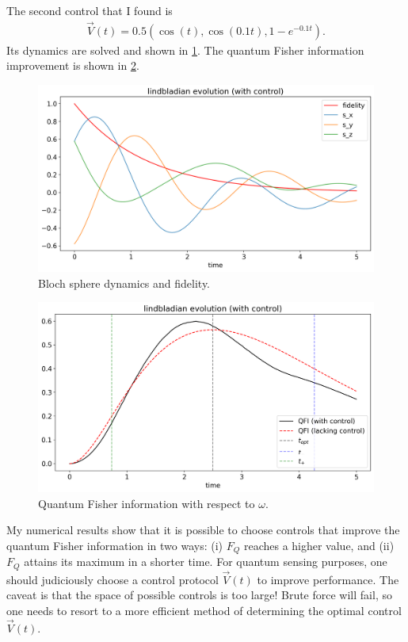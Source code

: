\documentclass[12pt]{article}
\begin{document}
The second control that I found is 
\begin{align}
    \vec{V}(t) = 0.5 (\cos(t), \cos(0.1 t), 1-e^{-0.1 t}).
\end{align}
Its dynamics are solved and shown in \ref{fig: bloch_yes_control2}. The quantum Fisher information improvement is shown in \ref{fig: info_yes_control2}.
\begin{figure}[ht]
    \centering
    \includegraphics[width=12cm]{bloch_yes_control2.png}
    \caption{Bloch sphere dynamics and fidelity.}
    \label{fig: bloch_yes_control2}
    \centering
\end{figure}
\begin{figure}[ht]
    \centering
    \includegraphics[width=12cm]{info_yes_control2.png}
    \caption{Quantum Fisher information with respect to $\omega$.}
    \label{fig: info_yes_control2}
    \centering
\end{figure}


My numerical results show that it is possible to choose controls that improve the quantum Fisher information in two ways: (i) $F_Q$ reaches a higher value, and (ii) $F_Q$ attains its maximum in a shorter time. For quantum sensing purposes, one should judiciously choose a control protocol $\vec{V}(t)$ to improve performance. The caveat is that the space of possible controls is too large! Brute force will fail, so one needs to resort to a more efficient method of determining the optimal control $\vec{V}(t)$. 
\end{document}
